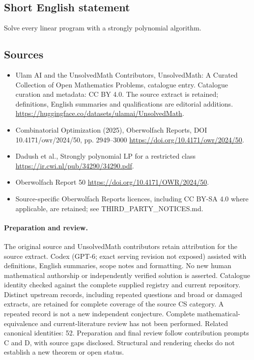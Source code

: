 \documentclass[11pt]{article}
\begin{document}
\subsection{Short English statement}
Solve every linear program with a strongly polynomial algorithm.
\subsection{Sources}
\begin{itemize}
\item[\hypertarget{source:statement:1}{S1}] Ulam AI and the UnsolvedMath Contributors, UnsolvedMath: A Curated Collection of Open Mathematics Problems, catalogue entry. Catalogue curation and metadata: CC BY 4.0. The source extract is retained; definitions, English summaries and qualifications are editorial additions.
\url{https://huggingface.co/datasets/ulamai/UnsolvedMath}.
\item[\hypertarget{source:statement:2}{S2}] Combinatorial Optimization (2025), Oberwolfach Reports, DOI 10.4171/owr/2024/50, pp. 2949--3000
\url{https://doi.org/10.4171/owr/2024/50}.
\item[\hypertarget{source:statement:3}{S3}] Dadush et al., Strongly polynomial LP for a restricted class
\url{https://ir.cwi.nl/pub/34290/34290.pdf}.
\item[\hypertarget{source:statement:4}{S4}] Oberwolfach Report 50
\url{https://doi.org/10.4171/OWR/2024/50}.
\item Source-specific Oberwolfach Reports licences, including CC BY-SA 4.0 where applicable, are retained; see THIRD\_PARTY\_NOTICES.md.
\end{itemize}
\paragraph{Preparation and review.}
The original source and UnsolvedMath contributors retain attribution for the source extract. Codex (GPT-6; exact serving revision not exposed) assisted with definitions, English summaries, scope notes and formatting. No new human mathematical authorship or independently verified solution is asserted. Catalogue identity checked against the complete supplied registry and current repository. Distinct upstream records, including repeated questions and broad or damaged extracts, are retained for complete coverage of the source CS category. A repeated record is not a new independent conjecture. Complete mathematical-equivalence and current-literature review has not been performed. Related canonical identities: 52. Preparation and final review follow contribution prompts C and D, with source gaps disclosed. Structural and rendering checks do not establish a new theorem or open status.
\label{end:statement}
\end{document}
